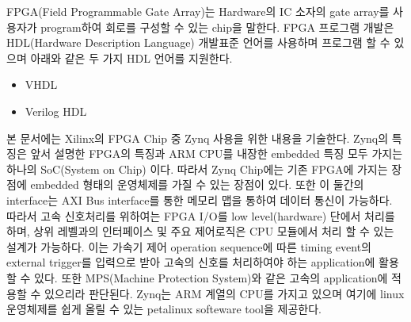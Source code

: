 \documentclass[11pt
  , a4paper
  , article
  , oneside
]{memoir}
\begin{document}
\clearpage

FPGA(Field Programmable Gate Array)는 Hardware의 IC 소자의 gate array를 사용자가 program하여 회로를 구성할 수 있는 chip을 말한다. FPGA 프로그램 개발은 HDL(Hardware Description Language) 개발표준 언어를 사용하며 프로그램 할 수 있으며 아래와 같은 두 가지 HDL 언어를 지원한다.

\begin{itemize}
	\item VHDL
	\item Verilog HDL
\end{itemize}

본 문서에는 Xilinx의 FPGA Chip 중 Zynq 사용을 위한 내용을 기술한다. Zynq의 특징은 앞서 설명한 FPGA의 특징과 ARM CPU를 내장한 embedded 특징 모두 가지는 하나의 SoC(System on Chip) 이다.  따라서 Zynq Chip에는 기존 FPGA에 가지는 장점에 embedded 형태의 운영체제를 가질 수 있는 장점이 있다. 또한 이 둘간의 interface는 AXI Bus interface를 통한 메모리 맵을 통하여 데이터 통신이 가능하다. 따라서 고속 신호처리를 위하여는 FPGA I/O를 low level(hardware) 단에서 처리를 하며, 상위 레벨과의 인터페이스 및 주요 제어로직은 CPU 모듈에서 처리 할 수 있는 설계가 가능하다. 이는 가속기 제어 operation sequence에 따른 timing event의 external trigger를 입력으로 받아 고속의 신호를 처리하여야 하는 application에 활용 할 수 있다. 또한 MPS(Machine Protection System)와 같은 고속의 application에 적용할 수 있으리라 판단된다.
Zynq는 ARM 계열의 CPU를 가지고 있으며 여기에 linux 운영체제를 쉽게 올릴 수 있는 petalinux softeware tool을 제공한다. 
\end{document}
